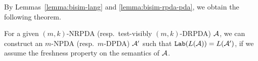 \smallskip

By Lemmas~\ref{lemma:bisim-lang} and \ref{lemma:bisim-rpda-pda},
we obtain the following theorem.
\begin{theorem}
\label{the: RPDAtoPDA}
For a given $(m,k)$-NRPDA (resp.\ test-visibly $(m,k)$-DRPDA) ${\cal A}$,
we can construct an $m$-NPDA (resp.\ $m$-DPDA) ${\cal A}'$
such that $\mathtt{Lab}(L({\cal A}))=L({\cal A}')$,
if we assume the freshness property on the semantics of ${\cal A}$.
\end{theorem}

